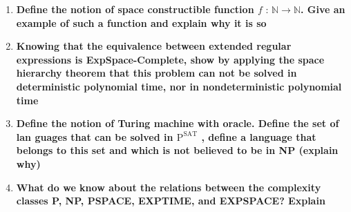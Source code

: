 \documentclass{article}
\begin{document}
\begin{enumerate}{}

\item \textbf{Define the notion of space constructible function $f \text{ : } \mathbb{N} \rightarrow \mathbb{N}$. Give an example of such a function and explain why it is so}

\item \textbf{Knowing that the equivalence between extended regular expressions is ExpSpace-Complete, show by applying the space hierarchy theorem that this problem can not be solved in deterministic polynomial time, nor in nondeterministic polynomial time}

\item \textbf{Define the notion of Turing machine with oracle. Define the set of lan guages that can be solved in $\text{P}^\text{SAT}$ , define a language that belongs to this set and which is not believed to be in NP (explain why)}

\item \textbf{What do we know about the relations between the complexity classes P, NP, PSPACE, EXPTIME, and EXPSPACE? Explain}


\end{enumerate}


%
%
\end{document}
